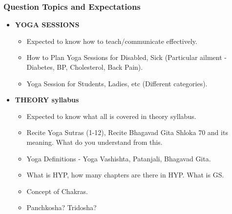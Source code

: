 \begin{frame}[fragile]\frametitle{Question Topics and Expectations }
    \begin{itemize}

        \item \textbf{YOGA SESSIONS}
        \begin{itemize}
            \item Expected to know how to teach/communicate effectively.
            \item How to Plan Yoga Sessions for Disabled, Sick (Particular ailment - Diabetes, BP, Cholesterol, Back Pain).
            \item Yoga Session for Students, Ladies, etc (Different categories).
        \end{itemize}
        \item \textbf{THEORY syllabus}
        \begin{itemize}
            \item Expected to know what all is covered in theory syllabus.
            \item Recite Yoga Sutras (1-12), Recite Bhagavad Gita Shloka 70 and its meaning. What do you understand from this.
            \item Yoga Definitions - Yoga Vashishta, Patanjali, Bhagavad Gita.
            \item What is HYP, how many chapters are there in HYP. What is GS.
            \item Concept of Chakras.
            \item Panchkosha? Tridosha?
        \end{itemize}
    \end{itemize}
\end{frame}
